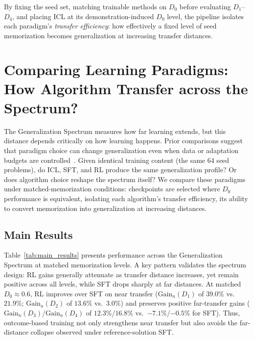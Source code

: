 \documentclass[]{bytedance_seed}
\theoremstyle{plain}
\theoremstyle{definition}
\theoremstyle{remark}
\begin{document}
By fixing the seed set, matching trainable methods on $D_0$ before evaluating $D_1$--$D_4$, and placing ICL at its demonstration-induced $D_0$ level, the pipeline isolates each paradigm's \emph{transfer efficiency}: how effectively a fixed level of seed memorization becomes generalization at increasing transfer distances.




\section{Comparing Learning Paradigms: How Algorithm Transfer across the Spectrum?}
\label{sec:results}

The Generalization Spectrum measures how far learning extends, but this distance depends critically on how learning happens. Prior comparisons suggest that paradigm choice can change generalization even when data or adaptation budgets are controlled~\citep{mosbach2023fewshot,chu2025sft}. Given identical training content (the same 64 seed problems), do ICL, SFT, and RL produce the same generalization profile? Or does algorithm choice reshape the spectrum itself?
We compare these paradigms under matched-memorization conditions: checkpoints are selected where $D_0$ performance is equivalent, isolating each algorithm's transfer efficiency, its ability to convert memorization into generalization at increasing distances.

\subsection{Main Results}
\label{subsec:main-results}

Table~\ref{tab:main_results} presents performance across the Generalization Spectrum at matched memorization levels. A key pattern validates the spectrum design: RL gains generally attenuate as transfer distance increases, yet remain positive across all levels, while SFT drops sharply at far distances. At matched $D_0{\approx}0.6$, RL improves over SFT on near transfer ($\text{Gain}_n(D_1)$ of $39.0\%$ vs.\ $21.9\%$; $\text{Gain}_n(D_2)$ of $13.6\%$ vs.\ $3.0\%$) and preserves positive far-transfer gains ($\text{Gain}_n(D_3)$/$\text{Gain}_n(D_4)$ of $12.3\%$/$16.8\%$ vs.\ $-7.1\%$/$-0.5\%$ for SFT). Thus, outcome-based training not only strengthens near transfer but also avoids the far-distance collapse observed under reference-solution SFT.


\newcommand{\cellp}[2]{\textbf{#1}$_{\textcolor{posgreen}{\uparrow\text{\tiny #2}}}$}
\newcommand{\celln}[2]{\textbf{#1}$_{\textcolor{negred}{\downarrow\text{\tiny #2}}}$}
\newcommand{\cellz}[2]{\textbf{#1}$_{\textcolor{gray}{\text{\tiny #2}}}$}
\newcommand{\cellna}{---}
\end{document}
